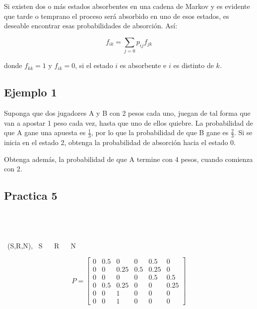 \documentclass{article}
\begin{document}
Si existen dos o más estados absorbentes en una cadena de Markov y es evidente que tarde o temprano el proceso será absorbido en uno de esos estados, es deseable encontrar esas probabilidades de absorción. Así:

\[
    f_{ik} = \sum_{j=0} p_{ij}f_{jk}
\]

donde \( f_{kk} = 1 \) y \( f_{ik} = 0 \), si el estado \( i \) es absorbente e \( i \) es distinto de \( k \).

\subsection*{Ejemplo 1}

Suponga que dos jugadores A y B con 2 pesos cada uno, juegan de tal forma que van a apostar 1 peso cada vez, hasta que uno de ellos quiebre. La probabilidad de que A gane una apuesta es \( \frac{1}{3} \), por lo que la probabilidad de que B gane es \( \frac{2}{3} \). Si se inicia en el estado 2, obtenga la probabilidad de absorción hacia el estado 0.

Obtenga además, la probabilidad de que A termine con 4 pesos, cuando comienza con 2.


\subsection{Practica 5}

 \\
 \\
 \\
 \ (S,R,N),  \ S \  \ R \  \ N \ 

\[
    P = \begin{bmatrix}
        0 & 0.5 & 0    & 0   & 0.5  & 0    \\
        0 & 0   & 0.25 & 0.5 & 0.25 & 0    \\
        0 & 0   & 0    & 0   & 0.5  & 0.5  \\
        0 & 0.5 & 0.25 & 0   & 0    & 0.25 \\
        0 & 0   & 1    & 0   & 0    & 0    \\
        0 & 0   & 1    & 0   & 0    & 0
    \end{bmatrix}
\]
\end{document}
